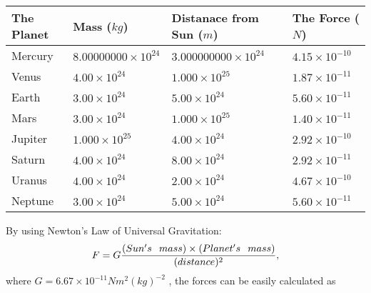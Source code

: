 \documentclass[12pt]{article}
\begin{document}
\vspace{0.2in}
 
 
\begin{tabular}{|l|l|l|l|}
\hline
The Planet & Mass ($kg$) & Distanace from Sun ($m$) & The Force ($N$)\\
\hline
Mercury  &
           $ %
8.00000000 \times 10^{24} $   &
             $ %
3.000000000 \times 10^{24} $    & $ %
4.15 \times 10^{-10} $
\\  \hline
Venus    &
           $  %
4.00 \times 10^{24}  $     &
             $ %
1.000 \times 10^{25} $    & $ %
1.87 \times 10^{-11} $
\\  \hline
Earth    &
           $  %
3.00 \times 10^{24}  $     &
             $ %
5.00 \times 10^{24} $    & $ %
5.60 \times 10^{-11} $
\\   \hline
Mars     &
           $  %
3.00 \times 10^{24} $     &
             $ %
1.000 \times 10^{25} $    & $ %
1.40 \times 10^{-11} $
\\   \hline
Jupiter  &
           $  %
1.000 \times 10^{25} $    &
             $ %
4.00 \times 10^{24} $    & $ %
2.92 \times 10^{-10} $
\\  \hline
Saturn   &
           $  %
4.00 \times 10^{24} $    &
             $ %
8.00 \times 10^{24}  $    & $ %
2.92 \times 10^{-11} $
\\  \hline
Uranus   &
           $  %
4.00 \times 10^{24} $    &
             $ %
2.00 \times 10^{24} $    & $ %
4.67 \times 10^{-10} $
\\  \hline
Neptune  &
           $  %
3.00 \times 10^{24} $    &
             $ %
5.00 \times 10^{24} $    & $ %
5.60 \times 10^{-11} $
\\  \hline
 
\end{tabular}
 
 
 
 
 
 
\noindent{}

By using Newton's Law of Universal Gravitation:
\[
F=G \frac{(Sun's \hspace{0.1in} mass) \times (Planet's \hspace{0.1in} mass)} { (distance)^2},
\]
where
$ G= %
6.67 \times 10^{-11} N m^{2}(kg)^{-2}$ , the forces can be easily calculated as
 
\vspace{0.2in}
 
\end{document}
